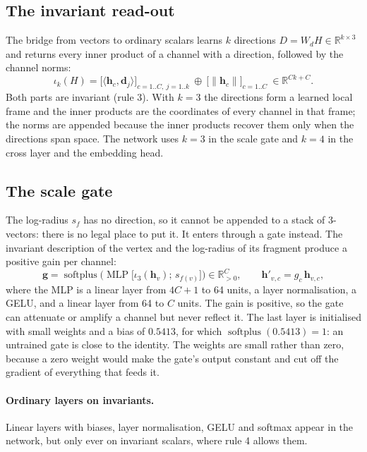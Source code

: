\documentclass[11pt,a4paper]{article}
\theoremstyle{remark}
\newcommand{\R}{\mathbb{R}}
\newcommand{\ip}[2]{\langle #1,#2\rangle}
\newcommand{\norm}[1]{\lVert #1\rVert}
\DeclareMathOperator{\softplus}{softplus}
\DeclareMathOperator{\MLP}{MLP}
\begin{document}
\subsection{The invariant read-out}
The bridge from vectors to ordinary scalars learns $k$ directions $D=W_dH\in\R^{k\times3}$ and returns every inner product of a channel with a direction, followed by the channel norms:
\begin{equation}
  \iota_k(H)=\Big[\ip{\mathbf h_c}{\mathbf d_j}\Big]_{c=1..C,\ j=1..k}\ \oplus\ \Big[\norm{\mathbf h_c}\Big]_{c=1..C}\ \in\R^{Ck+C}.
  \label{eq:readout}
\end{equation}
Both parts are invariant (rule 3). With $k=3$ the directions form a learned local frame and the inner products are the coordinates of every channel in that frame; the norms are appended because the inner products recover them only when the directions span space. The network uses $k=3$ in the scale gate and $k=4$ in the cross layer and the embedding head.

\subsection{The scale gate}
\label{sec:scalegate}
The log-radius $s_f$ has no direction, so it cannot be appended to a stack of 3-vectors: there is no legal place to put it. It enters through a gate instead. The invariant description of the vertex and the log-radius of its fragment produce a positive gain per channel:
\begin{equation}
  \mathbf g=\softplus\Big(\MLP\big[\iota_3(\mathbf h_v);\,s_{f(v)}\big]\Big)\in\R^{C}_{>0},\qquad
  \mathbf h'_{v,c}=g_c\,\mathbf h_{v,c},
\end{equation}
where the MLP is a linear layer from $4C+1$ to 64 units, a layer normalisation, a GELU, and a linear layer from 64 to $C$ units. The gain is positive, so the gate can attenuate or amplify a channel but never reflect it. The last layer is initialised with small weights and a bias of $0.5413$, for which $\softplus(0.5413)=1$: an untrained gate is close to the identity. The weights are small rather than zero, because a zero weight would make the gate's output constant and cut off the gradient of everything that feeds it.

\paragraph{Ordinary layers on invariants.} Linear layers with biases, layer normalisation, GELU and softmax appear in the network, but only ever on invariant scalars, where rule 4 allows them.
\end{document}
